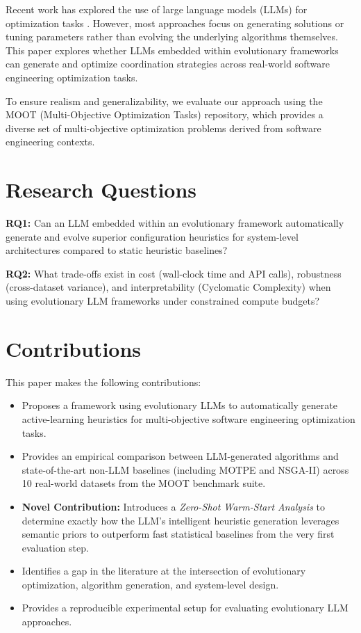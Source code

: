\documentclass[sigconf,nonacm]{acmart}
\begin{document}
Recent work has explored the use of large language models (LLMs) for optimization tasks \cite{romera2023mathematical}. However, most approaches focus on generating solutions or tuning parameters rather than evolving the underlying algorithms themselves. This paper explores whether LLMs embedded within evolutionary frameworks can generate and optimize coordination strategies across real-world software engineering optimization tasks.

To ensure realism and generalizability, we evaluate our approach using the MOOT (Multi-Objective Optimization Tasks) repository, which provides a diverse set of multi-objective optimization problems derived from software engineering contexts.

\section{Research Questions}

\noindent\textbf{RQ1:} Can an LLM embedded within an evolutionary framework automatically generate and evolve superior configuration heuristics for system-level architectures compared to static heuristic baselines?

\noindent\textbf{RQ2:} What trade-offs exist in cost (wall-clock time and API calls), robustness (cross-dataset variance), and interpretability (Cyclomatic Complexity) when using evolutionary LLM frameworks under constrained compute budgets?

\section{Contributions}

This paper makes the following contributions:
\begin{itemize}
\item Proposes a framework using evolutionary LLMs to automatically generate active-learning heuristics for multi-objective software engineering optimization tasks.
\item Provides an empirical comparison between LLM-generated algorithms and state-of-the-art non-LLM baselines (including MOTPE and NSGA-II) across 10 real-world datasets from the MOOT benchmark suite.
\item \textbf{Novel Contribution:} Introduces a \emph{Zero-Shot Warm-Start Analysis} to determine exactly how the LLM's intelligent heuristic generation leverages semantic priors to outperform fast statistical baselines from the very first evaluation step.
\item Identifies a gap in the literature at the intersection of evolutionary optimization, algorithm generation, and system-level design.
\item Provides a reproducible experimental setup for evaluating evolutionary LLM approaches.
\end{itemize}
\end{document}
